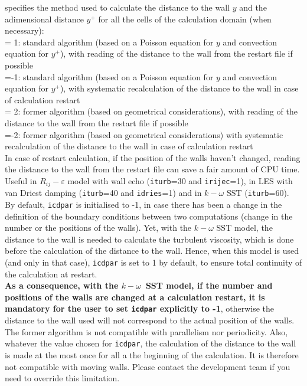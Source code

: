 {specifies the method used to calculate the distance to the wall $y$ and the
adimensional distance $y^+$ for all the
cells of the calculation domain (when necessary):\\
\hspace*{1.3cm}= 1: standard algorithm (based on a Poisson equation for $y$ and
convection equation for $y^+$),
with reading of the distance to the wall from the restart file
if possible\\
\hspace*{1.3cm}=-1: standard algorithm (based on a Poisson equation for $y$ and
convection equation for $y^+$),
with systematic recalculation of the distance to the wall in case of
calculation restart\\
\hspace*{1.3cm}= 2: former algorithm (based on geometrical
considerations),
with reading of the distance to the wall from the restart file
if possible\\
\hspace*{1.3cm}=-2: former algorithm (based on geometrical
considerations) with systematic recalculation of the distance to the
wall in case of calculation restart\\
In case of restart calculation, if the position of the walls haven't changed,
reading the distance to the wall from the restart file can save a fair amount of
CPU time.\\
Useful in $R_{ij}-\varepsilon$ model with wall echo ({\tt iturb}=30 and
{\tt irijec}=1), in LES with van Driest damping ({\tt iturb}=40 and
{\tt idries}=1) and in $k-\omega$ SST ({\tt iturb}=60). \\
By default, {\tt icdpar} is initialised to -1, in case there has been a change in the
definition of the boundary conditions between two computations (change in the
number or the positions of the walls). Yet, with the $k-\omega$ SST model, the
distance to the wall is needed to calculate the turbulent viscosity, which is
done before the calculation of the distance to the wall. Hence, when this model
is used (and only in that case), {\tt icdpar} is set to 1 by default, to ensure total
continuity of the calculation at restart.\\
{\bf As a consequence, with the \boldmath$k-\omega$\unboldmath\ SST model, if
the number and positions of the walls are changed at a calculation restart, it
is mandatory for the user to set {\tt icdpar} explicitly to -1}, otherwise the
distance to the wall used will not correspond to the actual position of the
walls.\\
The former algorithm is not compatible with parallelism nor periodicity. Also,
whatever the value chosen for {\tt icdpar}, the calculation of the distance to the
wall is made at the most once for all a the beginning of the calculation. It is
therefore not compatible with moving walls. Please contact the development team
if you need to override this limitation.}


